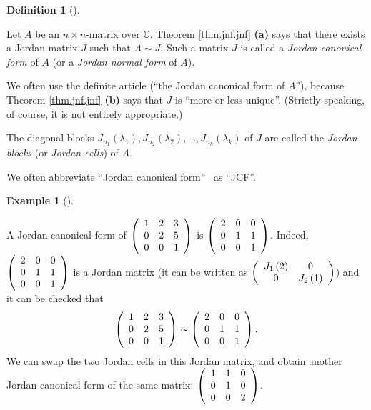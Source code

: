 \documentclass[numbers=enddot,12pt,final,onecolumn,notitlepage]{scrartcl}%
\numberwithin{exer}{subsection}
\theoremstyle{definition}
\newtheorem{defi}[theo]{Definition}
\newenvironment{definition}[1][]
{\begin{defi}[#1]\begin{leftbar}}
{\end{leftbar}\end{defi}}
\newtheorem{exam}[theo]{Example}
\newenvironment{example}[1][]
{\begin{exam}[#1]\begin{leftbar}}
{\end{leftbar}\end{exam}}
\begin{document}
\begin{definition}
\label{def.jnf.jnf}Let $A$ be an $n\times n$-matrix over $\mathbb{C}$. Theorem
\ref{thm.jnf.jnf} \textbf{(a)} says that there exists a Jordan matrix $J$ such
that $A\sim J$. Such a matrix $J$ is called a \emph{Jordan canonical form} of
$A$ (or a \emph{Jordan normal form} of $A$).

We often use the definite article (\textquotedblleft the Jordan canonical form
of $A$\textquotedblright), because Theorem \ref{thm.jnf.jnf} \textbf{(b)} says
that $J$ is \textquotedblleft more or less unique\textquotedblright. (Strictly
speaking, of course, it is not entirely appropriate.)

The diagonal blocks $J_{n_{1}}\left(  \lambda_{1}\right)  ,J_{n_{2}}\left(
\lambda_{2}\right)  ,\ldots,J_{n_{k}}\left(  \lambda_{k}\right)  $ of $J$ are
called the \emph{Jordan blocks} (or \emph{Jordan cells}) of $A$.

We often abbreviate \textquotedblleft Jordan canonical form\textquotedblright%
\ as \textquotedblleft JCF\textquotedblright.
\end{definition}

\begin{example}
A Jordan canonical form of $\left(
\begin{array}
[c]{ccc}%
1 & 2 & 3\\
0 & 2 & 5\\
0 & 0 & 1
\end{array}
\right)  $ is $\left(
\begin{array}
[c]{ccc}%
2 & 0 & 0\\
0 & 1 & 1\\
0 & 0 & 1
\end{array}
\right)  $. Indeed, $\left(
\begin{array}
[c]{ccc}%
2 & 0 & 0\\
0 & 1 & 1\\
0 & 0 & 1
\end{array}
\right)  $ is a Jordan matrix (it can be written as $\left(
\begin{array}
[c]{cc}%
J_{1}\left(  2\right)  & 0\\
0 & J_{2}\left(  1\right)
\end{array}
\right)  $) and it can be checked that%
\[
\left(
\begin{array}
[c]{ccc}%
1 & 2 & 3\\
0 & 2 & 5\\
0 & 0 & 1
\end{array}
\right)  \sim\left(
\begin{array}
[c]{ccc}%
2 & 0 & 0\\
0 & 1 & 1\\
0 & 0 & 1
\end{array}
\right)  .
\]
We can swap the two Jordan cells in this Jordan matrix, and obtain another
Jordan canonical form of the same matrix: $\left(
\begin{array}
[c]{ccc}%
1 & 1 & 0\\
0 & 1 & 0\\
0 & 0 & 2
\end{array}
\right)  $.
\end{example}
\end{document}
